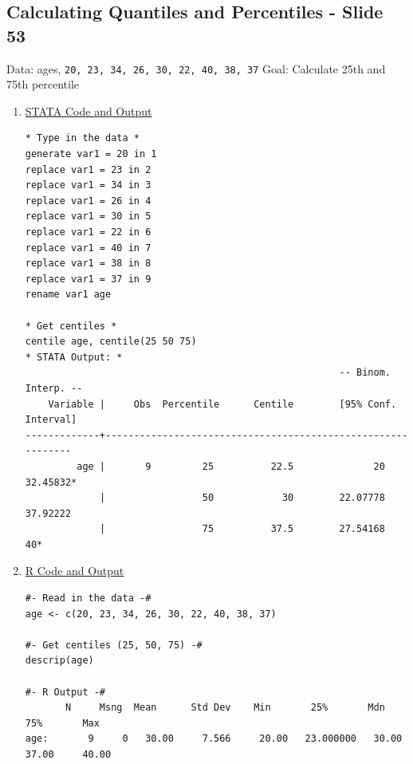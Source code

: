 \documentclass[11pt,letterpaper,fleqn]{report}
\begin{document}
\subsection{Calculating Quantiles and Percentiles - Slide 53}
Data: ages, \texttt{20, 23, 34, 26, 30, 22, 40, 38, 37}
\newline Goal: Calculate 25th and 75th percentile
\begin{enumerate}[]
\item \underline{STATA Code and Output}
{\scriptsize
\begin{verbatim}
* Type in the data *
generate var1 = 20 in 1
replace var1 = 23 in 2
replace var1 = 34 in 3
replace var1 = 26 in 4
replace var1 = 30 in 5
replace var1 = 22 in 6
replace var1 = 40 in 7
replace var1 = 38 in 8
replace var1 = 37 in 9
rename var1 age

* Get centiles *
centile age, centile(25 50 75)
* STATA Output: *
                                                       -- Binom. Interp. --
    Variable |     Obs  Percentile      Centile        [95% Conf. Interval]
-------------+-------------------------------------------------------------
         age |       9         25          22.5              20    32.45832*
             |                 50            30        22.07778    37.92222
             |                 75          37.5        27.54168          40*

\end{verbatim}}
\item \underline{R Code and Output}
{\scriptsize
\begin{verbatim}
#- Read in the data -#
age <- c(20, 23, 34, 26, 30, 22, 40, 38, 37)

#- Get centiles (25, 50, 75) -#
descrip(age)

#- R Output -#
       N     Msng  Mean      Std Dev    Min       25%       Mdn       75%       Max     
age:       9     0   30.00     7.566     20.00   23.000000   30.00     37.00     40.00  
\end{verbatim}}
\end{enumerate}
\end{document}
